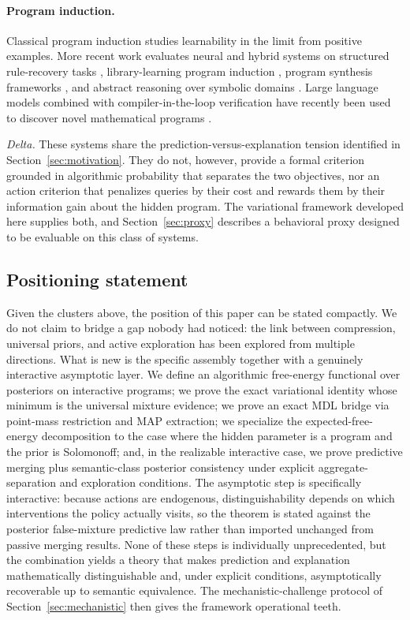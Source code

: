 \documentclass[11pt]{article}
\theoremstyle{remark}
\begin{document}
\paragraph{Program induction.}

Classical program induction \citep{Angluin1987,Muggleton1991} studies learnability in the limit from positive examples. More recent work evaluates neural and hybrid systems on structured rule-recovery tasks \citep{LakeEtAl2015,BalogEtAl2017DeepCoder}, library-learning program induction \citep{EllisEtAl2021DreamCoder}, program synthesis frameworks \citep{AlurEtAl2013SyGuS}, and abstract reasoning over symbolic domains \citep{CholletARC2019,Chollet2024ARC}. Large language models combined with compiler-in-the-loop verification have recently been used to discover novel mathematical programs \citep{RomeraParedesEtAl2024FunSearch}.

\textit{Delta.} These systems share the prediction-versus-explanation tension identified in Section~\ref{sec:motivation}. They do not, however, provide a formal criterion grounded in algorithmic probability that separates the two objectives, nor an action criterion that penalizes queries by their cost and rewards them by their information gain about the hidden program. The variational framework developed here supplies both, and Section~\ref{sec:proxy} describes a behavioral proxy designed to be evaluable on this class of systems.

\subsection{Positioning statement}
\label{sec:positioning}

Given the clusters above, the position of this paper can be stated compactly. We do not claim to bridge a gap nobody had noticed: the link between compression, universal priors, and active exploration has been explored from multiple directions. What is new is the specific assembly together with a genuinely interactive asymptotic layer. We define an algorithmic free-energy functional over posteriors on interactive programs; we prove the exact variational identity whose minimum is the universal mixture evidence; we prove an exact MDL bridge via point-mass restriction and MAP extraction; we specialize the expected-free-energy decomposition to the case where the hidden parameter is a program and the prior is Solomonoff; and, in the realizable interactive case, we prove predictive merging plus semantic-class posterior consistency under explicit aggregate-separation and exploration conditions. The asymptotic step is specifically interactive: because actions are endogenous, distinguishability depends on which interventions the policy actually visits, so the theorem is stated against the posterior false-mixture predictive law rather than imported unchanged from passive merging results. None of these steps is individually unprecedented, but the combination yields a theory that makes prediction and explanation mathematically distinguishable and, under explicit conditions, asymptotically recoverable up to semantic equivalence. The mechanistic-challenge protocol of Section~\ref{sec:mechanistic} then gives the framework operational teeth.
\end{document}
